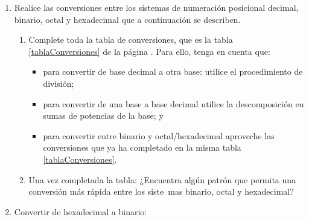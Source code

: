 \documentclass[12pt]{article}
\begin{document}
\begin{enumerate}[resume]

    \item Realice las conversiones entre los sistemas de numeración posicional          
          decimal, binario, octal y hexadecimal que a continuación se describen.
    
        \begin{enumerate}
        
        		\item Complete toda la tabla de conversiones, que es la 
              	  tabla \ref{tablaConversiones} de la 
              	  página \pageref{tablaConversiones}. \label{ejTabla} 
              	  Para ello, tenga en cuenta que:
          \begin{itemize}
             \item para convertir de base decimal a otra base: utilice el
        			   procedimiento de división;
           	\item para convertir de una base a base decimal
        			  utilice la descomposición en sumas de potencias de la base; y 
        		\item para convertir entre binario y octal/hexadecimal aproveche las
        			  conversiones que ya ha completado en la misma 
        			  tabla \ref{tablaConversiones}.
          \end{itemize}

            \item Una vez completada la tabla: ¿Encuentra algún patrón que
                permita una conversión más rápida entre los siste~mas binario,
                octal y hexadecimal?

        \end{enumerate}

    \item Convertir de hexadecimal a binario:



\end{enumerate}
\end{document}

